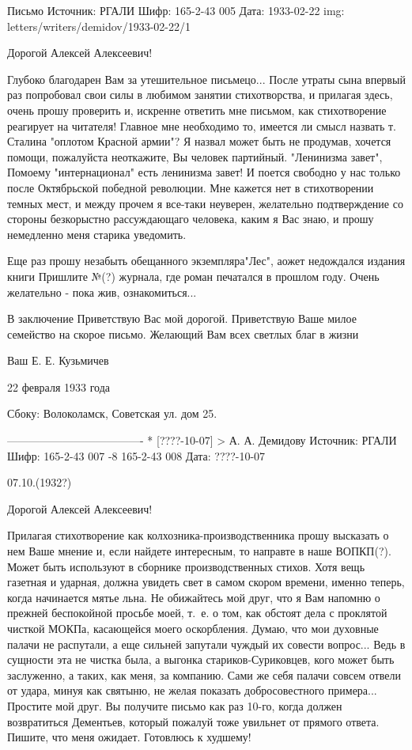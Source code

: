 Письмо
Источник: РГАЛИ
Шифр: 165-2-43 005
Дата: 1933-02-22
img: letters/writers/demidov/1933-02-22/1

Дорогой Алексей Алексеевич!

Глубоко благодарен Вам за утешительное письмецо... После утраты сына впервый раз попробовал свои силы в любимом занятии стихотворства, и прилагая здесь, очень прошу проверить и, искренне ответить мне письмом, как стихотворение реагирует на читателя! Главное мне необходимо то, имеется ли смысл назвать т. Сталина "оплотом Красной армии"? Я назвал может быть не продумав, хочется помощи, пожалуйста неоткажите, Вы человек партийный. "Ленинизма завет", Помоему "интернационал" есть ленинизма завет! И поется свободно у нас только после Октябрьской победной революции. Мне кажется нет в стихотворении темных мест, и между прочем я все-таки неуверен, желательно подтверждение со стороны безкорыстно рассуждающаго человека, каким я Вас знаю, и прошу немедленно меня старика уведомить.

Еще раз прошу незабыть обещанного экземпляра"Лес", аожет недождался издания книги Пришлите №(?) журнала, где роман печатался в прошлом году. Очень желательно - пока жив, ознакомиться...

В заключение Приветствую Вас мой дорогой. Приветствую Ваше милое семейство на скорое письмо. Желающий Вам всех светлых благ в жизни

Ваш Е. Е. Кузьмичев

22 февраля 1933 года

Сбоку: Волоколамск, Советская ул. дом 25.




-------------------------------------
* [????-10-07] > А. А. Демидову 
Источник: РГАЛИ
Шифр:   165-2-43 007 -8
        165-2-43 008
Дата: ????-10-07
                                                                       
07.10.(1932?)


                                                Дорогой 
                                      Алексей Алексеевич!

  Прилагая стихотворение как колхозника-производственника прошу высказать о нем Ваше мнение и, если найдете интересным, то направте в наше ВОПКП(?). Может быть используют в сборнике производственных стихов. Хотя вещь газетная и ударная, должна увидеть свет в самом скором времени, именно теперь, когда начинается мятье льна.
Не обижайтесь мой друг, что я Вам напомню о прежней беспокойной просьбе моей, т. е. о том, как обстоят дела с проклятой чисткой МОКПа, касающейся моего оскорбления.
Думаю, что мои духовные палачи не распутали, а еще сильней запутали чуждый их совести вопрос... Ведь в сущности эта не чистка была, а выгонка стариков-Суриковцев, кого может быть заслуженно, а таких, как меня, за компанию. Сами же себя палачи совсем отвели от удара, минуя как святыню, не желая показать добросовестного примера...
Простите мой друг. Вы получите письмо как раз 10-го, когда должен возвратиться Дементьев, который пожалуй тоже увильнет от прямого ответа. Пишите, что меня ожидает. Готовлюсь к худшему!

